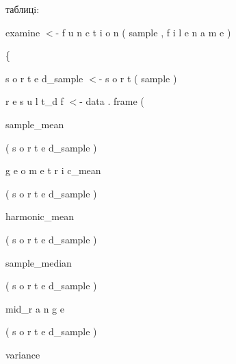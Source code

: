 \documentclass[a4paper,portrait,12pt]{article}
\begin{document}
\begin{flushleft}
таблицi:
\end{flushleft}


\begin{flushleft}
examine $<$- f u n c t i o n ( sample , f i l e n a m e )
\end{flushleft}


\{


\begin{flushleft}
s o r t e d\_sample $<$- s o r t ( sample )
\end{flushleft}


\begin{flushleft}
r e s u l t\_d f $<$- data . frame (
\end{flushleft}


\begin{flushleft}
sample\_mean
\end{flushleft}


\begin{flushleft}
( s o r t e d\_sample )
\end{flushleft}


\begin{flushleft}
g e o m e t r i c\_mean
\end{flushleft}


\begin{flushleft}
( s o r t e d\_sample )
\end{flushleft}


\begin{flushleft}
harmonic\_mean
\end{flushleft}


\begin{flushleft}
( s o r t e d\_sample )
\end{flushleft}


\begin{flushleft}
sample\_median
\end{flushleft}


\begin{flushleft}
( s o r t e d\_sample )
\end{flushleft}


\begin{flushleft}
mid\_r a n g e
\end{flushleft}


\begin{flushleft}
( s o r t e d\_sample )
\end{flushleft}


\begin{flushleft}
variance
\end{flushleft}
\end{document}
